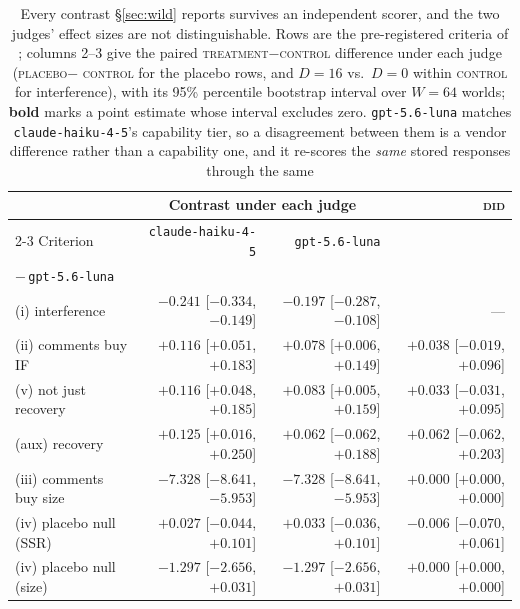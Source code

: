 \begin{table}[t]
  \centering\footnotesize
  \begin{tabular}{@{}lrrr@{}}
    \toprule
    & \multicolumn{2}{c}{Contrast under each judge} & \textsc{did} \\
    \cmidrule(lr){2-3}
    Criterion & \texttt{claude-haiku-4-5} & \texttt{gpt-5.6-luna} & \shortstack[r]{\texttt{claude-haiku-4-5}\\$-$\,\texttt{gpt-5.6-luna}} \\
    \midrule
    (i) interference & $\mathbf{-0.241}$ [$-0.334$, $-0.149$] & $\mathbf{-0.197}$ [$-0.287$, $-0.108$] & --- \\
    (ii) comments buy IF & $\mathbf{+0.116}$ [$+0.051$, $+0.183$] & $\mathbf{+0.078}$ [$+0.006$, $+0.149$] & $+0.038$ [$-0.019$, $+0.096$] \\
    (v) not just recovery & $\mathbf{+0.116}$ [$+0.048$, $+0.185$] & $\mathbf{+0.083}$ [$+0.005$, $+0.159$] & $+0.033$ [$-0.031$, $+0.095$] \\
    (aux) recovery & $\mathbf{+0.125}$ [$+0.016$, $+0.250$] & $+0.062$ [$-0.062$, $+0.188$] & $+0.062$ [$-0.062$, $+0.203$] \\
    (iii) comments buy size & $\mathbf{-7.328}$ [$-8.641$, $-5.953$] & $\mathbf{-7.328}$ [$-8.641$, $-5.953$] & $+0.000$ [$+0.000$, $+0.000$] \\
    (iv) placebo null (SSR) & $+0.027$ [$-0.044$, $+0.101$] & $+0.033$ [$-0.036$, $+0.101$] & $-0.006$ [$-0.070$, $+0.061$] \\
    (iv) placebo null (size) & $-1.297$ [$-2.656$, $+0.031$] & $-1.297$ [$-2.656$, $+0.031$] & $+0.000$ [$+0.000$, $+0.000$] \\
    \bottomrule
  \end{tabular}
  \caption{
    Every contrast \S\ref{sec:wild} reports survives an independent scorer, and the two judges'
    effect sizes are not distinguishable. Rows are the pre-registered criteria of
    ; columns 2--3 give the paired
    \textsc{treatment}$-$\textsc{control} difference under each judge (\textsc{placebo}$-$%
    \textsc{control} for the placebo rows, and $D{=}16$ vs.\ $D{=}0$ within \textsc{control}
    for interference), with its 95\% percentile bootstrap interval over $W{=}64$ worlds;
    \textbf{bold} marks a point estimate whose interval excludes zero. \texttt{gpt-5.6-luna} matches
    \texttt{claude-haiku-4-5}'s capability tier, so a disagreement between them is a vendor difference rather
    than a capability one, and it re-scores the \emph{same} stored responses through the same
}
\end{table}
